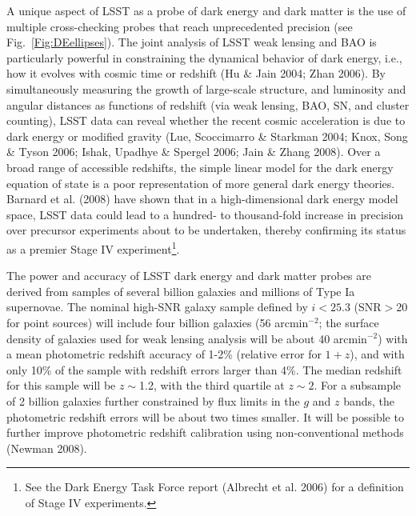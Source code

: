 \documentclass{emulateapj}
\begin{document}
A unique aspect of LSST as a probe of dark energy and dark matter is the use of 
multiple cross-checking probes that reach unprecedented precision (see
Fig.~\ref{Fig:DEellipses}). The joint analysis of LSST weak lensing and BAO is 
particularly powerful in constraining the dynamical behavior of dark energy, 
i.e., how it evolves with cosmic time or redshift (Hu \& Jain 2004; Zhan 2006).
By simultaneously measuring the growth of large-scale structure, 
and luminosity and angular distances as functions of redshift (via weak lensing, 
BAO, SN, and cluster counting), LSST data can reveal whether the recent cosmic 
acceleration is due to dark energy or modified gravity (Lue, Scoccimarro \& Starkman 
2004; Knox, Song \& Tyson 2006; Ishak, Upadhye \& Spergel 2006; Jain \& Zhang 2008). 
Over a broad range of accessible redshifts, the simple linear model
for the dark energy equation of state is a poor representation of more
general dark energy theories. Barnard et al. 
(2008) have shown that in a high-dimensional dark energy model space, 
LSST data could lead to a hundred- to thousand-fold increase in precision over 
precursor experiments about to be undertaken, thereby confirming its status as 
a premier Stage IV experiment\footnote{See the Dark Energy Task Force report 
(Albrecht et al. 2006) for a definition of Stage IV experiments.}. 

The power and accuracy of LSST dark energy and dark matter probes are derived 
from samples of several billion galaxies and millions of Type Ia
supernovae. The nominal high-SNR galaxy sample defined by $i<25.3$ (SNR$>$20 for point
sources) will include four billion galaxies (56 arcmin$^{-2}$; the surface density of galaxies 
used for weak lensing analysis will be about 40 arcmin$^{-2}$) with a mean 
photometric redshift accuracy of 1-2\% (relative error for $1+z$), and with 
only 10\% of the sample with redshift errors larger than 4\%. The median redshift for 
this sample will be $z\sim$1.2, with the third quartile at $z\sim2$. For a 
subsample of 2 billion galaxies further constrained by flux limits in the 
$g$ and $z$ bands, the photometric redshift errors will be about two times 
smaller. It will be possible to further improve photometric redshift calibration
using non-conventional methods (Newman 2008). 
\end{document}
